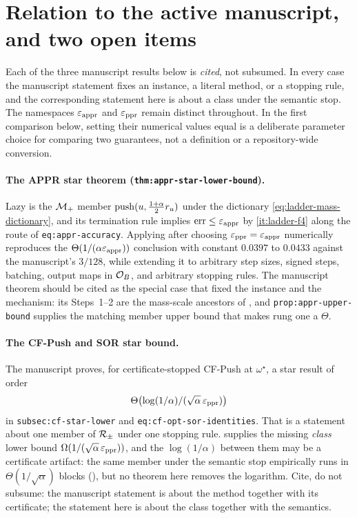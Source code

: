 \section{Relation to the active manuscript, and two open items}
\label{sec:ladder-manuscript-relation}

Each of the three manuscript results below is \emph{cited}, not subsumed. In
every case the manuscript statement fixes an instance, a literal method, or a
stopping rule, and the corresponding statement here is about a class under the
semantic stop. The namespaces $\varepsilon_{\mathrm{appr}}$ and $\varepsilon_{\mathrm{ppr}}$ remain distinct
throughout. In the first comparison below, setting their numerical values
equal is a deliberate parameter choice for comparing two guarantees, not a
definition or a repository-wide conversion.

\paragraph{The APPR star theorem (\texttt{thm:appr-star-lower-bound}).}
Lazy \APPR{} is the $\mathcal{M}_{+}$ member $\operatorname{push}(u,\tfrac{1+\alpha}{2}r_{u})$ under
the dictionary \eqref{eq:ladder-mass-dictionary}, and its termination rule
implies $\operatorname{err}\le\varepsilon_{\mathrm{appr}}$ by \ref{it:ladder-f4} along the route of
\texttt{eq:appr-accuracy}. Applying
 after choosing
$\varepsilon_{\mathrm{ppr}}=\varepsilon_{\mathrm{appr}}$ numerically reproduces the
$\Theta(1/(\alpha\varepsilon_{\mathrm{appr}}))$ conclusion with constant $0.0397$ to $0.0433$
against the manuscript's $3/128$, while extending it to arbitrary step sizes,
signed steps, batching, output maps in $\mathcal{O}_{B}$, and arbitrary stopping rules.
The manuscript theorem should be cited as the special case that fixed the
instance and the mechanism: its Steps~1--2 are the mass-scale ancestors of
, and
\texttt{prop:appr-upper-bound} supplies the matching member upper bound that
makes rung one a $\Theta$.

\paragraph{The CF-Push and SOR star bound.}
The manuscript proves, for certificate-stopped CF-Push at $\omega^{\star}$,
a star result of order
\[
    \Theta\bigl(\log(1/\alpha)/(\sqrt\alpha\,\varepsilon_{\mathrm{ppr}})\bigr)
\]
in \texttt{subsec:cf-star-lower} and \texttt{eq:cf-opt-sor-identities}. That
is a statement about one member of $\mathcal{R}_{\pm}$ under one stopping rule.
 supplies the
missing \emph{class} lower bound $\Omega(1/(\sqrt\alpha\,\varepsilon_{\mathrm{ppr}}))$, and the
$\log(1/\alpha)$ between them may be a certificate artifact: the same member
under the semantic stop empirically runs in $\Theta(1/\sqrt\alpha)$ blocks
(\statusmeasured), but no theorem here removes the logarithm. Cite, do not
subsume: the manuscript statement is about the
method together with its certificate; the statement here is about the class
together with the semantics.

